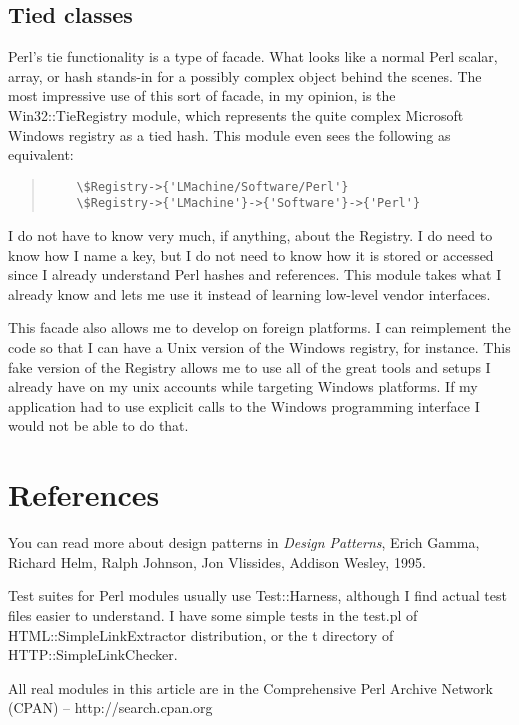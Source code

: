 	\subsection{Tied classes}

Perl's tie functionality is a type of facade.  What looks
like a normal Perl scalar, array, or hash stands-in for a
possibly complex object behind the scenes.  The most
impressive use of this sort of facade, in my opinion, is the
Win32::TieRegistry module, which represents the quite
complex Microsoft Windows registry as a tied hash.  This
module even sees the following as equivalent:

\begin{quote}
\begin{verbatim}
	\$Registry->{'LMachine/Software/Perl'}
	\$Registry->{'LMachine'}->{'Software'}->{'Perl'}	
\end{verbatim}
\end{quote}

I do not have to know very much, if anything, about the Registry.  I
do need to know how I name a key, but I do not need to know how it is
stored or accessed since I already understand Perl hashes and
references.  This module takes what I already know and lets me use it
instead of learning low-level vendor interfaces.

This facade also allows me to develop on foreign platforms. I can
reimplement the code so that I can have a Unix version of the Windows
registry, for instance.  This fake version of the Registry allows me
to use all of the great tools and setups I already have on my unix
accounts while targeting Windows platforms.  If my application had to
use explicit calls to the Windows programming interface I would not be
able to do that.

\section{References}

You can read more about design patterns in {\it Design Patterns},
Erich Gamma, Richard Helm, Ralph Johnson, Jon Vlissides, Addison
Wesley, 1995.

Test suites for Perl modules usually use Test::Harness, although I
find actual test files easier to understand.  I have some simple tests
in the test.pl of HTML::SimpleLinkExtractor distribution, or the t
directory of HTTP::SimpleLinkChecker.

All real modules in this article are in the Comprehensive Perl
Archive Network (CPAN) --
http://search.cpan.org
